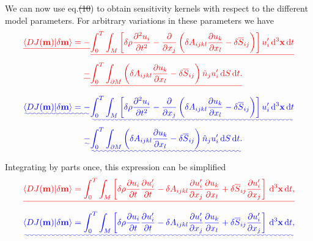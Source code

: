 \documentclass[a4paper,12pt]{paper}
\providecommand{\DIFadd}[1]{{\protect\color{blue}\uwave{#1}}} %
\providecommand{\DIFdel}[1]{{\protect\color{red}\sout{#1}}}                      %
\providecommand{\DIFaddbegin}{} %
\providecommand{\DIFaddend}{} %
\providecommand{\DIFdelbegin}{} %
\providecommand{\DIFdelend}{} %
\begin{document}
We can now use eq.\DIFdelbegin \DIFdel{(10}\DIFdelend \DIFaddbegin \DIFadd{~(\ref{eq:10}}\DIFaddend ) to obtain sensitivity kernels with respect to the different model parameters. For arbitrary 
variations in these parameters we have
\DIFdelbegin \begin{align*}
\DIFdel{\langle DJ(\mathbf{m})|\delta \mathbf{m}\rangle = -}&\DIFdel{\int_{0}^{T}\int_{M}\left[\delta\rho\frac{\partial^{2}u_{i}}{\partial t^{2}}-\frac{\partial}{\partial x_{j}}\left(\delta A_{ijkl}\frac{\partial u_{k}}{\partial x_{l}}-\delta\overline{S}_{ij}\right)\right]u_{i}'\dd^{3}\mathbf{x}\dd t \nonumber }\\
\DIFdel{-}&\DIFdel{\int_{0}^{T}\int_{\partial M}\left(\delta A_{ijkl}\frac{\partial u_{k}}{\partial x_{l}}-\delta\overline{S}_{ij}\right)\hat{n}_{j}u_{i}'\dd S\dd t.
}\end{align*}%
\DIFdelend \DIFaddbegin \begin{align}
\DIFadd{\langle DJ(\mathbf{m})|\delta \mathbf{m}\rangle = -}&\DIFadd{\int_{0}^{T}\int_{M}\left[\delta\rho\frac{\partial^{2}u_{i}}{\partial t^{2}}-\frac{\partial}{\partial x_{j}}\left(\delta A_{ijkl}\frac{\partial u_{k}}{\partial x_{l}}-\delta\overline{S}_{ij}\right)\right]u_{i}'\dd^{3}\mathbf{x}\dd t \nonumber }\\
\DIFadd{-}&\DIFadd{\int_{0}^{T}\int_{\partial M}\left(\delta A_{ijkl}\frac{\partial u_{k}}{\partial x_{l}}-\delta\overline{S}_{ij}\right)\hat{n}_{j}u_{i}'\dd S\dd t.
\label{eq:29}
}\end{align}\DIFaddend 
Integrating by parts once, this expression can be simplified \DIFdelbegin \begin{displaymath}
\DIFdel{\langle DJ(\mathbf{m})|\delta \mathbf{m}\rangle=\int_{0}^{T}\int_{M}\left[\delta\rho\frac{\partial u_{i}}{\partial t}\frac{\partial u_{i}'}{\partial t}-\delta A_{ijkl}\frac{\partial u_{i}'}{\partial x_{j}}\frac{\partial u_{k}}{\partial x_{l}}+\delta\overline{S}_{ij}\frac{\partial u_{i}'}{\partial x_{j}}\right]\dd^{3}\mathbf{x}\dd t,
}\end{displaymath}%
\DIFdelend \DIFaddbegin \DIFadd{to
}\begin{equation}
\DIFadd{\langle DJ(\mathbf{m})|\delta \mathbf{m}\rangle=\int_{0}^{T}\int_{M}\left[\delta\rho\frac{\partial u_{i}}{\partial t}\frac{\partial u_{i}'}{\partial t}-\delta A_{ijkl}\frac{\partial u_{i}'}{\partial x_{j}}\frac{\partial u_{k}}{\partial x_{l}}+\delta\overline{S}_{ij}\frac{\partial u_{i}'}{\partial x_{j}}\right]\dd^{3}\mathbf{x}\dd t,
\label{eq:30}
}\end{equation}\DIFaddend 
\end{document}
